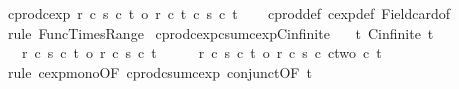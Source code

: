 \begin{isabellebody}
\endisatagproof
{\isafoldproof}%
%
\isadelimproof
\isanewline
%
\endisadelimproof
\isanewline
{}\isamarkupfalse%
\ cprod{\isacharunderscore}{\kern0pt}cexp{\isacharcolon}{\kern0pt}\ {\isachardoublequoteopen}{\isacharparenleft}{\kern0pt}r\ {\isacharasterisk}{\kern0pt}c\ s{\isacharparenright}{\kern0pt}\ {\isacharcircum}{\kern0pt}c\ t\ {\isacharequal}{\kern0pt}o\ r\ {\isacharcircum}{\kern0pt}c\ t\ {\isacharasterisk}{\kern0pt}c\ s\ {\isacharcircum}{\kern0pt}c\ t{\isachardoublequoteclose}\isanewline
%
\isadelimproof
\ \ %
\endisadelimproof
%
\isatagproof
{}\isamarkupfalse%
\ cprod{\isacharunderscore}{\kern0pt}def\ cexp{\isacharunderscore}{\kern0pt}def\ Field{\isacharunderscore}{\kern0pt}card{\isacharunderscore}{\kern0pt}of\ \isamarkupfalse%
\ {\isacharparenleft}{\kern0pt}rule\ Func{\isacharunderscore}{\kern0pt}Times{\isacharunderscore}{\kern0pt}Range{\isacharparenright}{\kern0pt}%
\endisatagproof
{\isafoldproof}%
%
\isadelimproof
\isanewline
%
\endisadelimproof
\isanewline
{}\isamarkupfalse%
\ cprod{\isacharunderscore}{\kern0pt}cexp{\isacharunderscore}{\kern0pt}csum{\isacharunderscore}{\kern0pt}cexp{\isacharunderscore}{\kern0pt}Cinfinite{\isacharcolon}{\kern0pt}\isanewline
\ \ \ t{\isacharcolon}{\kern0pt}\ {\isachardoublequoteopen}Cinfinite\ t{\isachardoublequoteclose}\isanewline
\ \ \ {\isachardoublequoteopen}{\isacharparenleft}{\kern0pt}r\ {\isacharasterisk}{\kern0pt}c\ s{\isacharparenright}{\kern0pt}\ {\isacharcircum}{\kern0pt}c\ t\ {\isasymle}o\ {\isacharparenleft}{\kern0pt}r\ {\isacharplus}{\kern0pt}c\ s{\isacharparenright}{\kern0pt}\ {\isacharcircum}{\kern0pt}c\ t{\isachardoublequoteclose}\isanewline
%
\isadelimproof
%
\endisadelimproof
%
\isatagproof
{}\isamarkupfalse%
\ {\isacharminus}{\kern0pt}\isanewline
\ \ \isamarkupfalse%
\ {\isachardoublequoteopen}{\isacharparenleft}{\kern0pt}r\ {\isacharasterisk}{\kern0pt}c\ s{\isacharparenright}{\kern0pt}\ {\isacharcircum}{\kern0pt}c\ t\ {\isasymle}o\ {\isacharparenleft}{\kern0pt}{\isacharparenleft}{\kern0pt}r\ {\isacharplus}{\kern0pt}c\ s{\isacharparenright}{\kern0pt}\ {\isacharcircum}{\kern0pt}c\ ctwo{\isacharparenright}{\kern0pt}\ {\isacharcircum}{\kern0pt}c\ t{\isachardoublequoteclose}\isanewline
\ \ \ \ \isamarkupfalse%
\ {\isacharparenleft}{\kern0pt}rule\ cexp{\isacharunderscore}{\kern0pt}mono{}{\isacharbrackleft}{\kern0pt}OF\ cprod{\isacharunderscore}{\kern0pt}csum{\isacharunderscore}{\kern0pt}cexp\ conjunct{}{\isacharbrackleft}{\kern0pt}OF\ t{\isacharbrackright}{\kern0pt}{\isacharbrackright}{\kern0pt}{\isacharparenright}{\kern0pt}\isanewline

\end{isabellebody}
